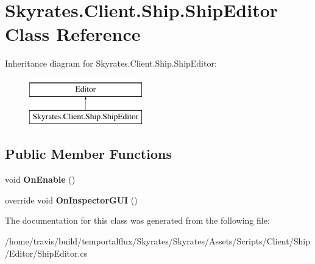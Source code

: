 \hypertarget{class_skyrates_1_1_client_1_1_ship_1_1_ship_editor}{\section{Skyrates.\-Client.\-Ship.\-Ship\-Editor Class Reference}
\label{class_skyrates_1_1_client_1_1_ship_1_1_ship_editor}
}
Inheritance diagram for Skyrates.\-Client.\-Ship.\-Ship\-Editor\-:\begin{figure}[H]
\begin{center}
\leavevmode
\includegraphics[height=2.000000cm]{class_skyrates_1_1_client_1_1_ship_1_1_ship_editor}
\end{center}
\end{figure}
\subsection*{Public Member Functions}
\begin{DoxyCompactItemize}
\item 
\hypertarget{class_skyrates_1_1_client_1_1_ship_1_1_ship_editor_a4aef493aabeb95b8b3e6d26c3dce6de3}{void {\bfseries On\-Enable} ()}\label{class_skyrates_1_1_client_1_1_ship_1_1_ship_editor_a4aef493aabeb95b8b3e6d26c3dce6de3}

\item 
\hypertarget{class_skyrates_1_1_client_1_1_ship_1_1_ship_editor_afc3277e63217d0626a13bfe21556f934}{override void {\bfseries On\-Inspector\-G\-U\-I} ()}\label{class_skyrates_1_1_client_1_1_ship_1_1_ship_editor_afc3277e63217d0626a13bfe21556f934}

\end{DoxyCompactItemize}


The documentation for this class was generated from the following file\-:\begin{DoxyCompactItemize}
\item 
/home/travis/build/temportalflux/\-Skyrates/\-Skyrates/\-Assets/\-Scripts/\-Client/\-Ship/\-Editor/Ship\-Editor.\-cs\end{DoxyCompactItemize}
